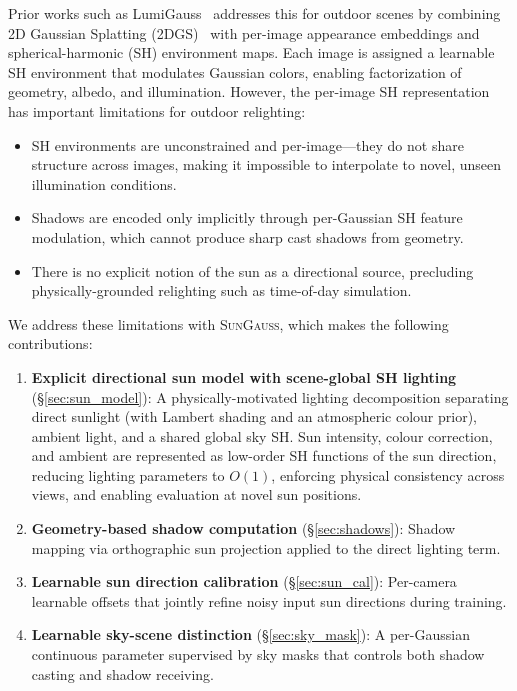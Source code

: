 \documentclass[conference]{IEEEtran}
\newcommand{\ours}{\textsc{SunGauss}}
\begin{document}
Prior works such as LumiGauss~\cite{joaxkal2024lumigauss} addresses this for outdoor scenes by combining 2D Gaussian Splatting (2DGS)~\cite{huang20242dgs} with per-image appearance embeddings and spherical-harmonic (SH) environment maps.
Each image is assigned a learnable SH environment that modulates Gaussian colors, enabling factorization of geometry, albedo, and illumination.
However, the per-image SH representation has important limitations for outdoor relighting:
\begin{itemize}
    \item SH environments are unconstrained and per-image---they do not share structure across images, making it impossible to interpolate to novel, unseen illumination conditions.
    \item Shadows are encoded only implicitly through per-Gaussian SH feature modulation, which cannot produce sharp cast shadows from geometry.
    \item There is no explicit notion of the sun as a directional source, precluding physically-grounded relighting such as time-of-day simulation.
\end{itemize}

We address these limitations with \ours{}, which makes the following contributions:

\begin{enumerate}
    \item \textbf{Explicit directional sun model with scene-global SH lighting} (\S\ref{sec:sun_model}): A physically-motivated lighting decomposition separating direct sunlight (with Lambert shading and an atmospheric colour prior), ambient light, and a shared global sky SH.  Sun intensity, colour correction, and ambient are represented as low-order SH functions of the sun direction, reducing lighting parameters to $O(1)$, enforcing physical consistency across views, and enabling evaluation at novel sun positions.

    \item \textbf{Geometry-based shadow computation} (\S\ref{sec:shadows}): Shadow mapping via orthographic sun projection applied to the direct lighting term.

    \item \textbf{Learnable sun direction calibration} (\S\ref{sec:sun_cal}): Per-camera learnable offsets that jointly refine noisy input sun directions during training.

    \item \textbf{Learnable sky-scene distinction} (\S\ref{sec:sky_mask}): A per-Gaussian continuous parameter supervised by sky masks that controls both shadow casting and shadow receiving.
\end{enumerate}
\end{document}
